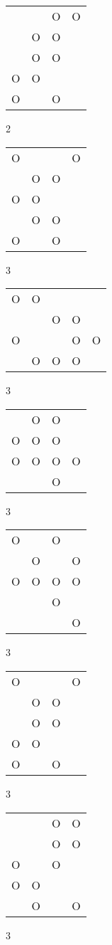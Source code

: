\begin{tabular}{|m{0.2cm}m{0.2cm}m{0.2cm}m{0.2cm}|}\hline
 & &O&O\\
 &O&O& \\
 &O&O& \\
O&O& & \\
O& &O& \\
\hline\end{tabular}2
\begin{tabular}{|m{0.2cm}m{0.2cm}m{0.2cm}m{0.2cm}|}\hline
O& & &O\\
 &O&O& \\
O&O& & \\
 &O&O& \\
O& &O& \\
\hline\end{tabular}3
\begin{tabular}{|m{0.2cm}m{0.2cm}m{0.2cm}m{0.2cm}m{0.2cm}|}\hline
O&O& & & \\
 & &O&O& \\
O& & &O&O\\
 &O&O&O& \\
\hline\end{tabular}3
\begin{tabular}{|m{0.2cm}m{0.2cm}m{0.2cm}m{0.2cm}|}\hline
 &O&O& \\
O&O&O& \\
O&O&O&O\\
 & &O& \\
\hline\end{tabular}3
\begin{tabular}{|m{0.2cm}m{0.2cm}m{0.2cm}m{0.2cm}|}\hline
O& &O& \\
 &O& &O\\
O&O&O&O\\
 & &O& \\
 & & &O\\
\hline\end{tabular}3
\begin{tabular}{|m{0.2cm}m{0.2cm}m{0.2cm}m{0.2cm}|}\hline
O& & &O\\
 &O&O& \\
 &O&O& \\
O&O& & \\
O& &O& \\
\hline\end{tabular}3
\begin{tabular}{|m{0.2cm}m{0.2cm}m{0.2cm}m{0.2cm}|}\hline
 & &O&O\\
 & &O&O\\
O& &O& \\
O&O& & \\
 &O& &O\\
\hline\end{tabular}3
